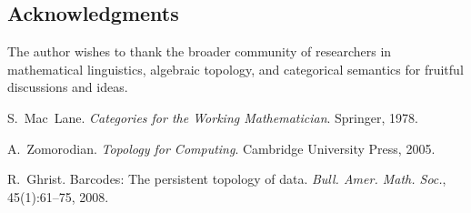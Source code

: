 \documentclass[11pt]{article}
\theoremstyle{definition}
\theoremstyle{remark}
\begin{document}
\subsection*{Acknowledgments}
The author wishes to thank the broader community of researchers in mathematical linguistics, algebraic topology, and categorical semantics for fruitful discussions and ideas.


\begin{thebibliography}{99}

S.~Mac~Lane.
\newblock \emph{Categories for the Working Mathematician}.
\newblock Springer, 1978.

A.~Zomorodian.
\newblock \emph{Topology for Computing}.
\newblock Cambridge University Press, 2005.

R.~Ghrist.
\newblock Barcodes: The persistent topology of data.
\newblock \emph{Bull. Amer. Math. Soc.}, 45(1):61--75, 2008.

\end{thebibliography}
\end{document}
